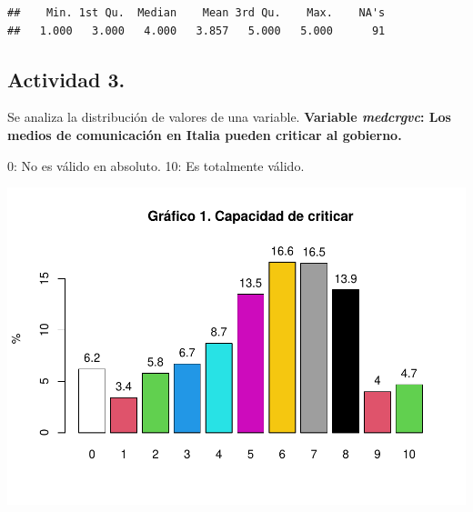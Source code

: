 \documentclass[
  12 pt,
  a4paper,
]{article}
\newenvironment{Shaded}{\begin{snugshade}}{\end{snugshade}}
\newcommand{\AttributeTok}[1]{\textcolor[rgb]{0.13,0.29,0.53}{#1}}
\newcommand{\ConstantTok}[1]{\textcolor[rgb]{0.56,0.35,0.01}{#1}}
\newcommand{\DecValTok}[1]{\textcolor[rgb]{0.00,0.00,0.81}{#1}}
\newcommand{\FunctionTok}[1]{\textcolor[rgb]{0.13,0.29,0.53}{\textbf{#1}}}
\newcommand{\NormalTok}[1]{#1}
\newcommand{\OtherTok}[1]{\textcolor[rgb]{0.56,0.35,0.01}{#1}}
\newcommand{\SpecialCharTok}[1]{\textcolor[rgb]{0.81,0.36,0.00}{\textbf{#1}}}
\newcommand{\StringTok}[1]{\textcolor[rgb]{0.31,0.60,0.02}{#1}}
\begin{document}
\begin{verbatim}
##    Min. 1st Qu.  Median    Mean 3rd Qu.    Max.    NA's 
##   1.000   3.000   4.000   3.857   5.000   5.000      91
\end{verbatim}

\subsection{Actividad 3.}\label{actividad-3.}

Se analiza la distribución de valores de una variable. \textbf{Variable
\emph{medcrgvc}: Los medios de comunicación en Italia pueden criticar al
gobierno.}

0: No es válido en absoluto. 10: Es totalmente válido.

\begin{Shaded}
\end{Shaded}

\includegraphics{libertadesItalia2022_files/figure-latex/dist-1.pdf}
\end{document}
